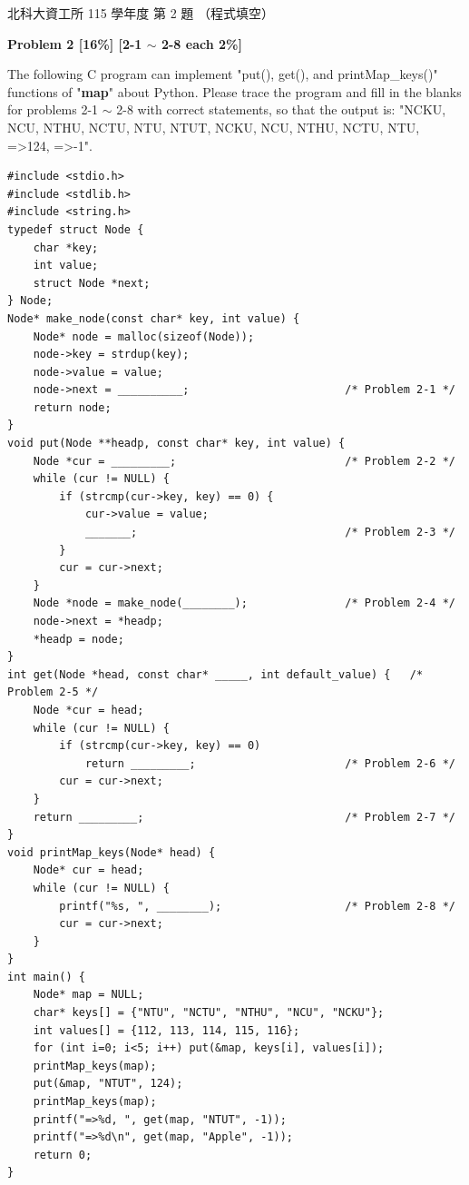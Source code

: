 \begin{pastexam}[label={px:ntut-115-prog-02}]{北科大資工所 115 學年度 第 2 題}
（程式填空）

\textbf{Problem 2 [16\%] [2-1 $\sim$ 2-8 each 2\%]}

The following C program can implement "put(), get(), and printMap\_keys()" functions of "\textbf{map}" about Python. Please trace the program and fill in the blanks for problems 2-1 $\sim$ 2-8 with correct statements, so that the output is: "NCKU, NCU, NTHU, NCTU, NTU, NTUT, NCKU, NCU, NTHU, NCTU, NTU, =>124, =>-1".
\begin{verbatim}
#include <stdio.h>
#include <stdlib.h>
#include <string.h>
typedef struct Node {
    char *key;
    int value;
    struct Node *next;
} Node;
Node* make_node(const char* key, int value) {
    Node* node = malloc(sizeof(Node));
    node->key = strdup(key);
    node->value = value;
    node->next = __________;                        /* Problem 2-1 */
    return node;
}
void put(Node **headp, const char* key, int value) {
    Node *cur = _________;                          /* Problem 2-2 */
    while (cur != NULL) {
        if (strcmp(cur->key, key) == 0) {
            cur->value = value;
            _______;                                /* Problem 2-3 */
        }
        cur = cur->next;
    }
    Node *node = make_node(________);               /* Problem 2-4 */
    node->next = *headp;
    *headp = node;
}
int get(Node *head, const char* _____, int default_value) {   /* Problem 2-5 */
    Node *cur = head;
    while (cur != NULL) {
        if (strcmp(cur->key, key) == 0)
            return _________;                       /* Problem 2-6 */
        cur = cur->next;
    }
    return _________;                               /* Problem 2-7 */
}
void printMap_keys(Node* head) {
    Node* cur = head;
    while (cur != NULL) {
        printf("%s, ", ________);                   /* Problem 2-8 */
        cur = cur->next;
    }
}
int main() {
    Node* map = NULL;
    char* keys[] = {"NTU", "NCTU", "NTHU", "NCU", "NCKU"};
    int values[] = {112, 113, 114, 115, 116};
    for (int i=0; i<5; i++) put(&map, keys[i], values[i]);
    printMap_keys(map);
    put(&map, "NTUT", 124);
    printMap_keys(map);
    printf("=>%d, ", get(map, "NTUT", -1));
    printf("=>%d\n", get(map, "Apple", -1));
    return 0;
}
\end{verbatim}
\end{pastexam}

